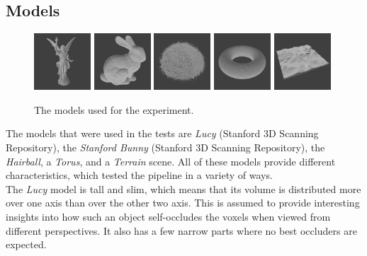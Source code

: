 \subsection*{Models} \label{subsec-models}

\begin{figure}[h]
  \centering
  \includegraphics[width=80px]{images/graphics/model-lucy.jpg}
  \includegraphics[width=80px]{images/graphics/model-bunny.jpg}
  \includegraphics[width=80px]{images/graphics/model-hairball.jpg}
  \includegraphics[width=80px]{images/graphics/model-torus.jpg}
  \includegraphics[width=80px]{images/graphics/model-terrain.jpg}
  \caption{The models used for the experiment.}
  \label{fig:experiment-models}
\end{figure}

\noindent
The models that were used in the tests are \emph{Lucy} (Stanford 3D Scanning Repository), the \emph{Stanford Bunny} 
(Stanford 3D Scanning Repository), the \emph{Hairball}, a \emph{Torus}, and a \emph{Terrain} scene. All of 
these models provide different characteristics, which tested the pipeline in a variety of ways. \\

\noindent
The \emph{Lucy} model is tall and slim, which means that its volume is distributed more over one axis 
than over the other two axis. This is assumed to provide interesting insights into how such an object 
self-occludes the voxels when viewed from different perspectives. It also has a few narrow parts where 
no best occluders are expected. \\

